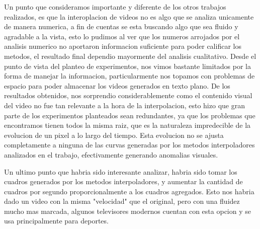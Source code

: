 Un punto que consideramos importante y diferente de los otros trabajos realizados, es que la interoplacion de videos no es algo que se analiza unicamente de manera numerica, a fin de cuentas se esta buscando algo que sea fluido y agradable a la vista, esto lo pudimos al ver que los numeros arrojados por el analisis numerico no aportaron informacion suficiente para poder calificar los metodos, el resultado final dependio mayormente del analisis cualitativo. Desde el punto de vista del planteo de experimentos, nos vimos bastante limitados por la forma de manejar la informacion, particularmente nos topamos con problemas de espacio para poder almacenar los videos generados en texto plano. De los resultados obtenidos, nos sorprendio considerablemente como el contenido visual del video no fue tan relevante a la hora de la interpolacion, esto hizo que gran parte de los experimentos planteados sean redundantes, ya que los problemas que encontramos tienen todos la misma raiz, que es la naturaleza impredecible de la evolucion de un pixel a lo largo del tiempo. Esta evolucion no se ajusta completamente a ninguna de las curvas generadas por los metodos interpoladores analizados en el trabajo, efectivamente generando anomalias visuales.

Un ultimo punto que habria sido interesante analizar, habria sido tomar los cuadros generados por los metodos interpoladores, y aumentar la cantidad de cuadros por segundo proporcionalmente a los cuadros agregados. Esto nos habria dado un video con la misma "velocidad" que el original, pero con una fluidez mucho mas marcada, algunos televisores modernos cuentan con esta opcion y se usa principalmente para deportes.
